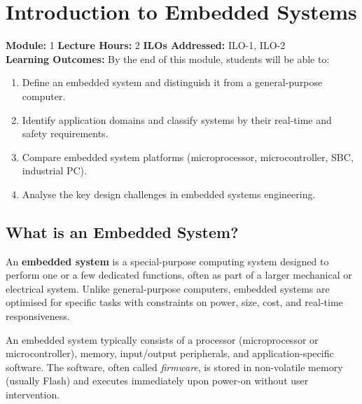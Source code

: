 
\chapter{Introduction to Embedded Systems}
\label{ch:intro}

\begin{moduleinfo}
  \textbf{Module:} 1 \quad
  \textbf{Lecture Hours:} 2 \quad
  \textbf{ILOs Addressed:} ILO-1, ILO-2 \\[4pt]
  \textbf{Learning Outcomes:} By the end of this module, students will be able to:
  \begin{enumerate}[nosep]
    \item Define an embedded system and distinguish it from a general-purpose computer.
    \item Identify application domains and classify systems by their real-time and safety requirements.
    \item Compare embedded system platforms (microprocessor, microcontroller, SBC, industrial PC).
    \item Analyse the key design challenges in embedded systems engineering.
  \end{enumerate}
\end{moduleinfo}

\section{What is an Embedded System?}
\label{sec:intro:what}

\begin{definition}
An \textbf{embedded system} is a special-purpose computing system designed to perform one or a few dedicated functions, often as part of a larger mechanical or electrical system. Unlike general-purpose computers, embedded systems are optimised for specific tasks with constraints on power, size, cost, and real-time responsiveness.
\end{definition}

An embedded system typically consists of a processor (microprocessor or microcontroller), memory, input/output peripherals, and application-specific software. The software, often called \emph{firmware}, is stored in non-volatile memory (usually Flash) and executes immediately upon power-on without user intervention.

